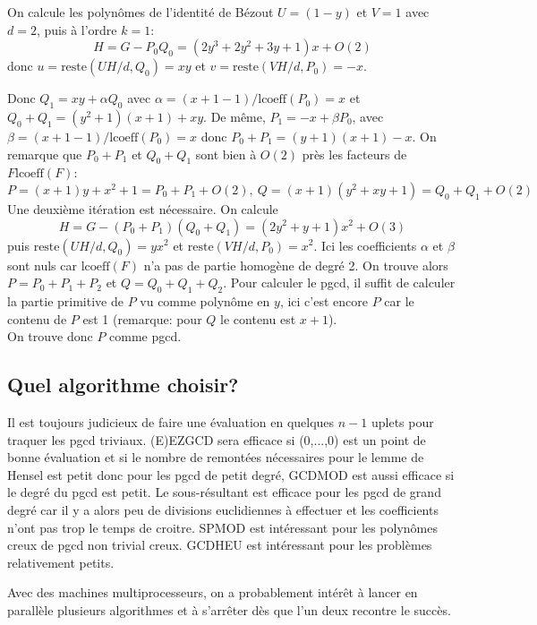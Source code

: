 \documentclass[a4paper,11pt]{article}
\begin{document}
\begin{giacjshere}
On calcule les polynômes de l'identité de Bézout $U = ( 1 - y )$ et $V = 1$
avec $d = 2$, puis à l'ordre $k = 1$:
\[ H = G - P_0 Q_0 = ( 2 y^3 + 2 y^2 + 3 y + 1 ) x + O ( 2 ) \]
donc $u = \mbox{reste} ( U H / d, Q_0 ) = x y$ et $v = \mbox{reste} ( V H / d,
P_0 ) = - x$.

Donc $Q_1 = x y + \alpha Q_0$ avec $\alpha = ( x + 1 - 1 ) / \mbox{lcoeff} (
P_0 ) = x$ et $Q_0 + Q_1 = ( y^2 + 1 ) ( x + 1 ) + x y$. De
même, $P_1 = - x + \beta P_0$, avec $\beta = ( x + 1 - 1 ) / \mbox{lcoeff} (
P_0 ) = x$ donc $P_0 + P_1 = ( y + 1 ) ( x + 1 ) - x$. On remarque que $P_0 +
P_1$ et $Q_0 + Q_1$ sont bien à $O ( 2 )$ près les facteurs de $F
\mbox{lcoeff} ( F )$:
\[ P = ( x + 1 ) y + x^2 + 1 = P_0 + P_1 + O ( 2 ), \ Q = ( x +
   1 ) ( y^2 + x y + 1 ) = Q_0 + Q_1 + O ( 2 ) \]
Une deuxième itération est nécessaire. On calcule
\[ \text{$H = G - ( P_0 + P_1 ) ( Q_0 + Q_1 ) = ( 2 y^2 + y + 1 ) x^2 + O ( 3
   )$} \]
puis $\mbox{reste} ( U H / d, Q_0 ) = y x^2$ et $\mbox{reste} ( V H / d, P_0 )
= x^2$. Ici les coefficients $\alpha$ et $\beta$ sont nuls car $\mbox{lcoeff}
( F )$ n'a pas de partie homogène de degré 2. On trouve alors $P = P_0 + P_1 +
P_2$ et $Q = Q_0 + Q_1 + Q_2$. Pour calculer le pgcd, il suffit de calculer la
partie primitive de $P$ vu comme polynôme en $y$, ici c'est encore $P$ car le
contenu de $P$ est 1 (remarque: pour $Q$ le contenu est $x + 1$).\\
On trouve donc $P$ comme pgcd.

\subsection{Quel algorithme choisir?}

Il est toujours judicieux de faire une évaluation en quelques $n - 1$ uplets
pour traquer les pgcd triviaux. (E)EZGCD sera efficace si (0,...,0) est un
point de bonne évaluation et si le nombre de remontées nécessaires pour le
lemme de Hensel est petit donc pour les pgcd de petit degré, GCDMOD est aussi
efficace si le degré du pgcd est petit. Le sous-résultant est efficace pour
les pgcd de grand degré car il y a alors peu de divisions euclidiennes à
effectuer et les coefficients n'ont pas trop le temps de croitre. SPMOD est
intéressant pour les polynômes creux de pgcd non trivial creux. GCDHEU est
intéressant pour les problèmes relativement petits.

Avec des machines multiprocesseurs, on a probablement intérêt à lancer en
parallèle plusieurs algorithmes et à s'arrêter dès que l'un deux recontre le
succès.


\end{giacjshere}
\end{document}
